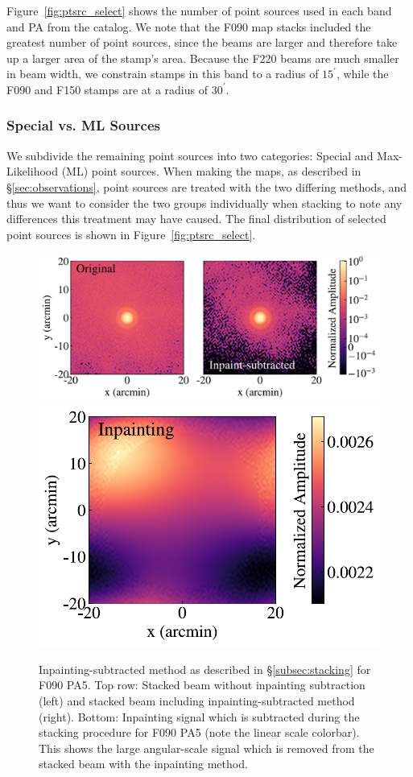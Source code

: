 Figure~\ref{fig:ptsrc_select} shows the number of point sources used in each band and PA from the catalog.  We note that the F090 map stacks included the greatest number of point sources, since the beams are larger and therefore take up a larger area of the stamp's area.  Because the F220 beams are much smaller in beam width, we constrain stamps in this band to a radius of $15^{\prime}$, while the F090 and F150 stamps are at a radius of $30^{\prime}$.

\subsubsection{Special vs. ML Sources}
\label{subsubsec:type_sel}
We subdivide the remaining point sources into two categories: Special and Max-Likelihood (ML) point sources.  When making the maps, as described in \S\ref{sec:observations}, point sources are treated with the two differing methods, and thus we want to consider the two groups individually when stacking to note any differences this treatment may have caused.  The final distribution of selected point sources is shown in Figure~\ref{fig:ptsrc_select}.

\begin{figure}[t]
    \centering
    \includegraphics[height=.35\textwidth]{Figures/inpaint1.pdf}
    \includegraphics[height=.35\textwidth]{Figures/inpaint2.pdf}
    \caption{Inpainting-subtracted method as described in \S\ref{subsec:stacking} for F090 PA5.  Top row: Stacked beam without inpainting subtraction (left) and stacked beam including inpainting-subtracted method (right).  Bottom: Inpainting signal which is subtracted during the stacking procedure for F090 PA5 (note the linear scale colorbar).  This shows the large angular-scale signal which is removed from the stacked beam with the inpainting method.}
    \label{fig:example_maps}
    \vspace{1em}
\end{figure}

